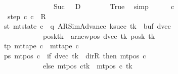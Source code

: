 \begin{isabellebody}
\ \ \ \ \ \ \ \ \ \ \ \ \ \ \ \ \ \ \ \ {\isasymand}\ Suc\ {}\ {\isacharequal}{\kern0pt}\ {\isacharquery}{\kern0pt}D{\isacharparenright}{\kern0pt}{\isachardoublequoteclose}\isanewline
\ \ \ \ \ \ \isamarkupfalse%
\ True\ \isamarkupfalse%
\ simp\isanewline
\ \ \ \ \isamarkupfalse%
\ c{\isacharprime}{\kern0pt}\ \isanewline
\ \ \ \ \ \ \ \ step{\isacharcolon}{\kern0pt}\ {\isachardoublequoteopen}{\isacharparenleft}{\kern0pt}c{}{\isacharcomma}{\kern0pt}\ c{\isacharprime}{\kern0pt}{\isacharparenright}{\kern0pt}\ {\isasymin}\ {\isacharquery}{\kern0pt}R{\isachardoublequoteclose}\isanewline
\ \ \ \ \ \ \ st{\isacharcolon}{\kern0pt}\ {\isachardoublequoteopen}mt{\isacharunderscore}{\kern0pt}state\ c{\isacharprime}{\kern0pt}\ {\isacharequal}{\kern0pt}\ {\isacharparenleft}{\kern0pt}q{\isacharcomma}{\kern0pt}\ AR{\isacharunderscore}{\kern0pt}SimAdvance{\isacharcomma}{\kern0pt}\ k{\isacharunderscore}{\kern0pt}succ\ tk{\isacharcomma}{\kern0pt}\ {}{\isacharcomma}{\kern0pt}\ buf{\isacharcomma}{\kern0pt}\ dvec{\isacharcomma}{\kern0pt}\isanewline
\ \ \ \ \ \ \ \ \ \ \ \ \ \ \ \ \ \ posk{\isacharparenleft}{\kern0pt}tk\ {\isacharcolon}{\kern0pt}{\isacharequal}{\kern0pt}\ ar{\isacharunderscore}{\kern0pt}newpos\ {\isacharparenleft}{\kern0pt}dvec\ tk{\isacharparenright}{\kern0pt}\ {\isacharparenleft}{\kern0pt}posk\ tk{\isacharparenright}{\kern0pt}{\isacharparenright}{\kern0pt}{\isacharparenright}{\kern0pt}{\isachardoublequoteclose}\isanewline
\ \ \ \ \ \ \ tp{\isacharcolon}{\kern0pt}\ {\isachardoublequoteopen}mt{\isacharunderscore}{\kern0pt}tape\ c{\isacharprime}{\kern0pt}\ {\isacharequal}{\kern0pt}\ mt{\isacharunderscore}{\kern0pt}tape\ c{}{\isachardoublequoteclose}\isanewline
\ \ \ \ \ \ \ ps{\isacharcolon}{\kern0pt}\ {\isachardoublequoteopen}mt{\isacharunderscore}{\kern0pt}pos\ c{\isacharprime}{\kern0pt}\ {\isacharequal}{\kern0pt}\ {\isacharparenleft}{\kern0pt}if\ dvec\ tk\ {\isacharequal}{\kern0pt}\ dir{\isachardot}{\kern0pt}R\ then\ mt{\isacharunderscore}{\kern0pt}pos\ c{}\isanewline
\ \ \ \ \ \ \ \ \ \ \ \ \ \ \ \ \ \ else\ {\isacharparenleft}{\kern0pt}mt{\isacharunderscore}{\kern0pt}pos\ c{}{\isacharparenright}{\kern0pt}{\isacharparenleft}{\kern0pt}tk\ {\isacharcolon}{\kern0pt}{\isacharequal}{\kern0pt}\ mt{\isacharunderscore}{\kern0pt}pos\ c{}\ tk\ {\isacharminus}{\kern0pt}\ {}{\isacharparenright}{\kern0pt}{\isacharparenright}{\kern0pt}{\isachardoublequoteclose}\isanewline

\end{isabellebody}
